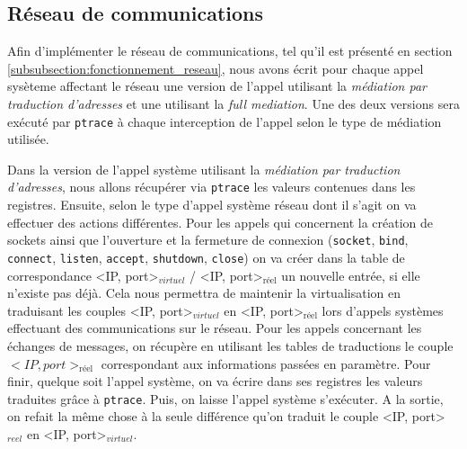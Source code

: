 \subsection{Réseau de communications}
\label{subsection:network_implementaion}

Afin d'implémenter le réseau de communications, tel qu'il est présenté en section \ref{subsubsection:fonctionnement_reseau}, nous avons écrit pour chaque appel sysèteme affectant le réseau une version de l'appel utilisant la \textit{médiation par traduction d'adresses} et une utilisant la \textit{full mediation}. Une des deux versions sera exécuté par \texttt{ptrace} à chaque interception de l'appel selon le type de médiation utilisée.

Dans la version de l'appel système utilisant la \textit{médiation par traduction d'adresses}, nous allons récupérer via \texttt{ptrace} les valeurs contenues dans les registres. Ensuite, selon le type d'appel système réseau dont il s'agit on va effectuer des actions différentes. Pour les appels qui concernent la création de sockets ainsi que l'ouverture et la fermeture de connexion (\texttt{socket}, \texttt{bind}, \texttt{connect}, \texttt{listen}, \texttt{accept}, \texttt{shutdown}, \texttt{close}) on va créer dans la table de correspondance <IP, port>$_{virtuel}$ / <IP, port>$_{\text{réel}}$ un nouvelle entrée, si elle n'existe pas déjà. Cela nous permettra de maintenir la virtualisation en traduisant les couples <IP, port>$_{virtuel}$ en <IP, port>$_{\text{réel}}$ lors d'appels systèmes effectuant des communications sur le réseau. Pour les appels concernant les échanges de messages, on récupère en utilisant les tables de traductions le couple  $<IP, port>_{\text{réel}}$ correspondant aux informations passées en paramètre. Pour finir, quelque soit l'appel système, on va écrire dans ses registres les valeurs traduites grâce à \texttt{ptrace}. Puis, on laisse l'appel système s'exécuter. A la sortie, on refait la même chose à la seule différence qu'on traduit le couple  <IP, port>$_{reel}$ en <IP, port>$_{virtuel}$.

